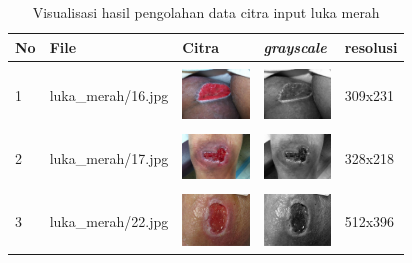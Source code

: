 \begin{table}[H]
	\centering
	\caption{Visualisasi hasil pengolahan data citra input luka merah}
	\label{tabel_input_8}
	\begin{tabular}{|m{0.2in}|m{1.2in}|m{0.7in}|m{0.7in}|m{0.7in}|}
		\hline
		\textbf{No} & \textbf{File} & \textbf{Citra} & \textbf{\emph{grayscale}} & \textbf{resolusi} \\
		\hline
		
		& &  &  &\\
		1 & 
		luka\_merah/16.jpg &
		\includegraphics[width=0.7in]{dataset/dataset_3/luka_merah/ready/16.jpg}&
		\includegraphics[width=0.7in]{dataset/dataset_3/luka_merah/ready/16_gray.jpg}&
		309x231\\
		\hline
		
		& &  &  &\\
		2& 
		luka\_merah/17.jpg &
		\includegraphics[width=0.7in]{dataset/dataset_3/luka_merah/ready/17.jpg}&
		\includegraphics[width=0.7in]{dataset/dataset_3/luka_merah/ready/17_gray.jpg}&
		328x218\\
		\hline
		
		& &  &  &\\
		3& 
		luka\_merah/22.jpg &
		\includegraphics[width=0.7in]{dataset/dataset_3/luka_merah/ready/22.jpg}&
		\includegraphics[width=0.7in]{dataset/dataset_3/luka_merah/ready/22_gray.jpg}&
		512x396\\
		\hline
		

\end{tabular}
\end{table}
